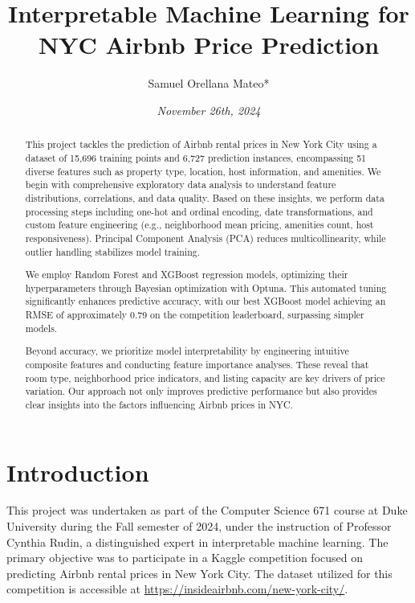 \documentclass[12pt]{article}
\begin{document}
\title{\textbf{Interpretable Machine Learning for NYC Airbnb Price Prediction}}
\author{Samuel Orellana Mateo*}
\date{\textit{November 26th, 2024}}

\maketitle


\begin{abstract}

This project tackles the prediction of Airbnb rental prices in New York City using a dataset of 15,696 training points and 6,727 prediction instances, encompassing 51 diverse features such as property type, location, host information, and amenities. We begin with comprehensive exploratory data analysis to understand feature distributions, correlations, and data quality. Based on these insights, we perform data processing steps including one-hot and ordinal encoding, date transformations, and custom feature engineering (e.g., neighborhood mean pricing, amenities count, host responsiveness). Principal Component Analysis (PCA) reduces multicollinearity, while outlier handling stabilizes model training.

We employ Random Forest and XGBoost regression models, optimizing their hyperparameters through Bayesian optimization with Optuna. This automated tuning significantly enhances predictive accuracy, with our best XGBoost model achieving an RMSE of approximately 0.79 on the competition leaderboard, surpassing simpler models.

Beyond accuracy, we prioritize model interpretability by engineering intuitive composite features and conducting feature importance analyses. These reveal that room type, neighborhood price indicators, and listing capacity are key drivers of price variation. Our approach not only improves predictive performance but also provides clear insights into the factors influencing Airbnb prices in NYC.

\end{abstract}
    


\thispagestyle{firstpage}

\newpage

\setcounter{page}{1}

\section{Introduction}

This project was undertaken as part of the Computer Science 671 course at Duke University during the Fall semester of 2024, under the instruction of Professor Cynthia Rudin, a distinguished expert in interpretable machine learning. The primary objective was to participate in a Kaggle competition focused on predicting Airbnb rental prices in New York City. The dataset utilized for this competition is accessible at \url{https://insideairbnb.com/new-york-city/}.
\end{document}
